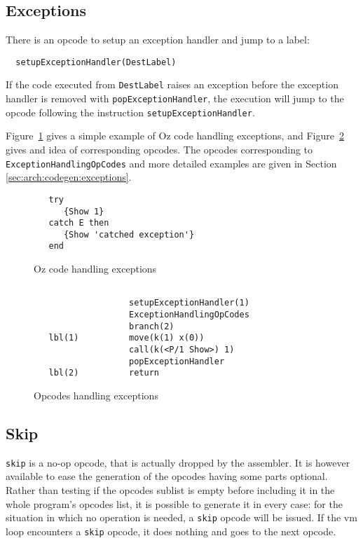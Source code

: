 \documentclass[a4paper]{memoir}
\begin{document}
\subsection{Exceptions}
There is an opcode to setup an exception handler and jump to a label:
\begin{lstlisting}
  setupExceptionHandler(DestLabel)
\end{lstlisting}
If the code executed from \lstinline!DestLabel! raises an exception before  the exception handler
is removed with \lstinline!popExceptionHandler!, the execution will jump to the
opcode following the instruction \lstinline!setupExceptionHandler!.

Figure~\ref{fig:opcodes:exception:oz} gives a simple example of Oz code
handling exceptions, and Figure~\ref{fig:opcodes:exception:result} gives and
idea of corresponding opcodes. The opcodes corresponding to
\lstinline!ExceptionHandlingOpCodes! and more detailed examples are given in
Section \ref{sec:arch:codegen:exceptions}.
\begin{figure}[ht]
\begin{lstlisting}
   try
      {Show 1}
   catch E then
      {Show 'catched exception'}
   end
\end{lstlisting}
\caption{Oz code handling exceptions}
\label{fig:opcodes:exception:oz}
\end{figure}



\begin{figure}[ht]
\begin{lstlisting}
    
                   setupExceptionHandler(1)
                   ExceptionHandlingOpCodes
                   branch(2)
   lbl(1)          move(k(1) x(0))
                   call(k(<P/1 Show>) 1)
                   popExceptionHandler
   lbl(2)          return
\end{lstlisting}
\caption{Opcodes handling exceptions}
\label{fig:opcodes:exception:result}
\end{figure}


\subsection{Skip}
\lstinline!skip! is a no-op opcode, that is actually dropped by the assembler.
It is however available to ease the generation of the opcodes having some parts
optional. Rather than testing if the opcodes sublist is empty before including
it in the whole program's opcodes list, it is possible to generate it in every
case: for the situation in which no operation is needed, a \lstinline!skip! opcode will be
issued.
If the vm loop encounters a \lstinline!skip! opcode, it does nothing and goes to the next opcode.
\end{document}
